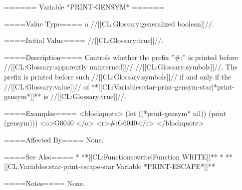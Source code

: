 ====== Variable *PRINT-GENSYM* ======

====Value Type====
a //[[CL:Glossary:generalized boolean]]//.

====Initial Value====
//[[CL:Glossary:true]]//.

====Description====
Controls whether the prefix ''#:'' is printed before //[[CL:Glossary:apparently uninterned]]// //[[CL:Glossary:symbols]]//. The prefix is printed before such //[[CL:Glossary:symbols]]// if and only if the //[[CL:Glossary:value]]// of **[[CL:Variables:star-print-gensym-star|*print-gensym*]]** is //[[CL:Glossary:true]]//.

====Examples====
<blockquote>
(let ((*print-gensym* nil)) 
  (print (gensym)))
<o>G6040 </o>
<r>#:G6040</r>
</blockquote>

====Affected By====
None.

====See Also====
  * **[[CL:Functions:write|Function WRITE]]**
  * **[[CL:Variables:star-print-escape-star|Variable *PRINT-ESCAPE*]]**

====Notes====
None.


